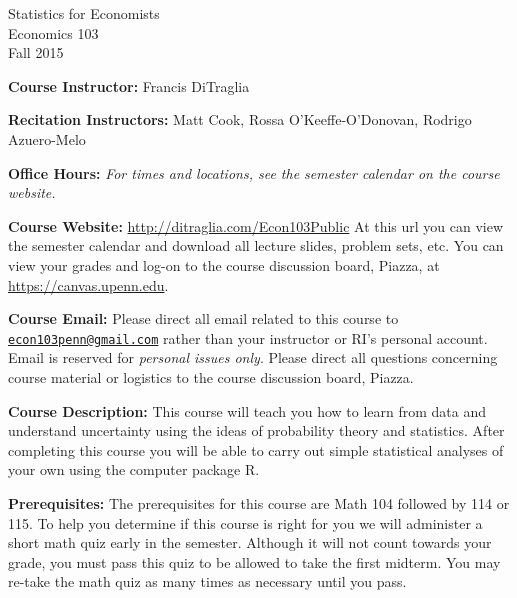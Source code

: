 \documentclass[11pt, letterpaper]{article}
\begin{document}
\thispagestyle{plain}

\begin{center}
\Large
\sc
Statistics for Economists\\
\large
Economics 103\\
\large
Fall 2015
\end{center}


\normalsize
\bigskip
\noindent \textbf{Course Instructor:} Francis DiTraglia 

\medskip


\noindent \textbf{Recitation Instructors:}
  Matt Cook,  
  Rossa O'Keeffe-O'Donovan,
  Rodrigo Azuero-Melo
\medskip


\noindent \textbf{Office Hours:} \emph{For times and locations, see the semester calendar on the course website.}


\medskip
 
\noindent \textbf{Course Website:} \url{http://ditraglia.com/Econ103Public} At this url you can view the semester calendar and download all lecture slides, problem sets, etc.
You can view your grades and log-on to the course discussion board, Piazza, at \url{https://canvas.upenn.edu}.

\medskip

\noindent \textbf{Course Email:} Please direct all email related to this course to \href{mailto:econ103penn@gmail.com}{\texttt{econ103penn@gmail.com}} rather than your instructor or RI's personal account.
Email is reserved for \emph{personal issues only}. 
Please direct all questions concerning course material or logistics to the course discussion board, Piazza.

\medskip



\noindent \textbf{Course Description:} 
This course will teach you how to learn from data and understand uncertainty using the ideas of probability theory and statistics. 
After completing this course you will be able to carry out simple statistical analyses of your own using the computer package R.


\medskip

\noindent \textbf{Prerequisites:} 
The prerequisites for this course are Math 104 followed by 114 or 115. 
To help you determine if this course is right for you we will administer a short math quiz early in the semester.
Although it will not count towards your grade, you must pass this quiz to be allowed to take the first midterm.
You may re-take the math quiz as many times as necessary until you pass.
\end{document}
